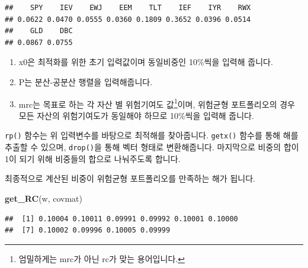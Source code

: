 \documentclass[12pt,]{book}
\newenvironment{Shaded}{\begin{snugshade}}{\end{snugshade}}
\newcommand{\DecValTok}[1]{\textcolor[rgb]{0.00,0.00,0.81}{#1}}
\newcommand{\KeywordTok}[1]{\textcolor[rgb]{0.13,0.29,0.53}{\textbf{#1}}}
\newcommand{\NormalTok}[1]{#1}
\newcommand{\OperatorTok}[1]{\textcolor[rgb]{0.81,0.36,0.00}{\textbf{#1}}}
\newcommand{\StringTok}[1]{\textcolor[rgb]{0.31,0.60,0.02}{#1}}
\providecommand{\tightlist}{%
  \setlength{\itemsep}{0pt}\setlength{\parskip}{0pt}}
\let\rmarkdownfootnote\footnote%
\def\footnote{\protect\rmarkdownfootnote}
\begin{document}
\begin{Shaded}
\end{Shaded}

\begin{verbatim}
##    SPY    IEV    EWJ    EEM    TLT    IEF    IYR    RWX 
## 0.0622 0.0470 0.0555 0.0360 0.1809 0.3652 0.0396 0.0514 
##    GLD    DBC 
## 0.0867 0.0755
\end{verbatim}

\begin{enumerate}
\def\labelenumi{\arabic{enumi}.}
\tightlist
\item
  x0은 최적화를 위한 초기 입력값이며 동일비중인 10\%씩을 입력해 줍니다.
\item
  P는 분산-공분산 행렬을 입력해줍니다.
\item
  mrc는 목표로 하는 각 자산 별 위험기여도 값\footnote{엄밀하게는 mrc가 아닌 rc가 맞는 용어입니다.}이며, 위험균형 포트폴리오의 경우 모든 자산의 위험기여도가 동일해야 하므로 10\%씩을 입력해 줍니다.
\end{enumerate}

\texttt{rp()} 함수는 위 입력변수를 바탕으로 최적해를 찾아줍니다. \texttt{getx()} 함수를 통해 해를 추출할 수 있으며, \texttt{drop()}을 통해 벡터 형태로 변환해줍니다. 마지막으로 비중의 합이 1이 되기 위해 비중들의 합으로 나눠주도록 합니다.

최종적으로 계산된 비중이 위험균형 포트폴리오를 만족하는 해가 됩니다.

\begin{Shaded}
\begin{Highlighting}[]
\KeywordTok{get_RC}\NormalTok{(w, covmat)}
\end{Highlighting}
\end{Shaded}

\begin{verbatim}
##  [1] 0.10004 0.10011 0.09991 0.09992 0.10001 0.10000
##  [7] 0.10002 0.09996 0.10005 0.09999
\end{verbatim}
\end{document}
